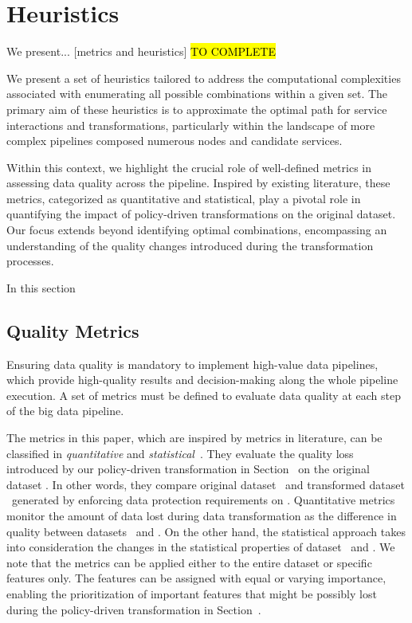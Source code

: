 \section{Heuristics}\label{sec:coalition}
We present... [metrics and heuristics] \hl{TO COMPLETE}

We present a set of heuristics tailored to address the computational complexities associated with enumerating all possible combinations within a given set. The primary aim of these heuristics is to approximate the optimal path for service interactions and transformations, particularly within the landscape of more complex pipelines composed numerous nodes and candidate services.

Within this context, we highlight the crucial role of well-defined metrics in assessing data quality across the pipeline. Inspired by existing literature, these metrics, categorized as quantitative and statistical, play a pivotal role in quantifying the impact of policy-driven transformations on the original dataset.
Our focus extends beyond identifying optimal combinations, encompassing an understanding of the quality changes introduced during the transformation processes.

In this section
\subsection{Quality Metrics}\label{sec:metrics}


Ensuring data quality is mandatory to implement high-value data pipelines, which provide high-quality results and decision-making along the whole pipeline execution. A set of metrics must be defined to evaluate data quality at each step of the big data pipeline.

The metrics in this paper, which are inspired by metrics in literature, can be classified in \emph{quantitative} and \emph{statistical}~\cite{ADD}. They evaluate the quality loss introduced by our policy-driven transformation in Section~\cite{ADD} on the original dataset \origdataset. In other words, they compare original dataset \origdataset\ and transformed dataset \transdataset\ generated by enforcing data protection requirements on \origdataset. Quantitative metrics monitor the amount of data lost during data transformation as the difference in quality between datasets \origdataset\ and \transdataset.
On the other hand, the statistical approach takes into consideration the changes in the statistical properties of dataset \origdataset\ and \transdataset.
We note that the metrics can be applied either to the entire dataset or specific features only.
The features can be assigned with equal or varying importance, enabling the prioritization of important features that might be possibly lost during the policy-driven transformation in Section~\cite{ADD}.

